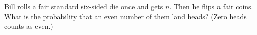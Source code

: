 Bill rolls a fair standard six-sided die once and gets $n$. Then he flips $n$ fair coins. What is the probability that an even number of them land heads? (Zero heads counts as even.)
